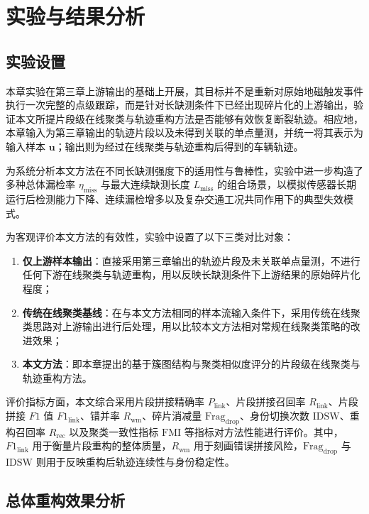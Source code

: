 \documentclass{xdupgthesis}
\begin{document}
\section{实验与结果分析}

\subsection{实验设置}

本章实验在第三章上游输出的基础上开展，其目标并不是重新对原始地磁触发事件执行一次完整的点级跟踪，而是针对长缺测条件下已经出现碎片化的上游输出，验证本文所提片段级在线聚类与轨迹重构方法是否能够有效恢复断裂轨迹。相应地，本章输入为第三章输出的轨迹片段以及未得到关联的单点量测，并统一将其表示为输入样本 $\mathbf{u}$；输出则为经过在线聚类与轨迹重构后得到的车辆轨迹。

为系统分析本文方法在不同长缺测强度下的适用性与鲁棒性，实验中进一步构造了多种总体漏检率 $\eta_{\mathrm{miss}}$ 与最大连续缺测长度 $L_{\mathrm{miss}}$ 的组合场景，以模拟传感器长期运行后检测能力下降、连续漏检增多以及复杂交通工况共同作用下的典型失效模式。

为客观评价本文方法的有效性，实验中设置了以下三类对比对象：
\begin{enumerate}
	\item \textbf{仅上游样本输出}：直接采用第三章输出的轨迹片段及未关联单点量测，不进行任何下游在线聚类与轨迹重构，用以反映长缺测条件下上游结果的原始碎片化程度；
	\item \textbf{传统在线聚类基线}：在与本文方法相同的样本流输入条件下，采用传统在线聚类思路对上游输出进行后处理，用以比较本文方法相对常规在线聚类策略的改进效果；
	\item \textbf{本文方法}：即本章提出的基于簇图结构与聚类相似度评分的片段级在线聚类与轨迹重构方法。
\end{enumerate}

评价指标方面，本文综合采用片段拼接精确率 $P_{\mathrm{link}}$、片段拼接召回率 $R_{\mathrm{link}}$、片段拼接 $F1$ 值 $F1_{\mathrm{link}}$、错并率 $R_{\mathrm{wm}}$、碎片消减量 $\mathrm{Frag}_{\mathrm{drop}}$、身份切换次数 $\mathrm{IDSW}$、重构召回率 $R_{\mathrm{rec}}$ 以及聚类一致性指标 $\mathrm{FMI}$ 等指标对方法性能进行评价。其中，$F1_{\mathrm{link}}$ 用于衡量片段重构的整体质量，$R_{\mathrm{wm}}$ 用于刻画错误拼接风险，$\mathrm{Frag}_{\mathrm{drop}}$ 与 $\mathrm{IDSW}$ 则用于反映重构后轨迹连续性与身份稳定性。

\subsection{总体重构效果分析}
\end{document}
